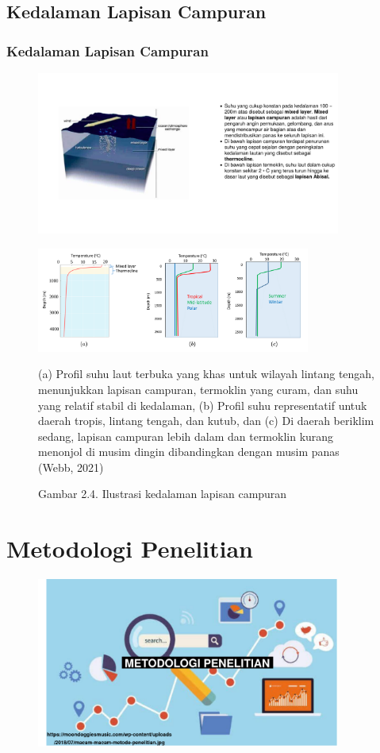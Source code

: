 \documentclass{beamer}
\begin{document}
\subsection{Kedalaman Lapisan Campuran}
\begin{frame}[allowframebreaks]
	\frametitle{Kedalaman Lapisan Campuran}
		\begin{figure}[H]
			\centering
			\includegraphics[width=10cm]{mld_1.png}
		\end{figure}	
		\begin{figure}[H]
		\centering
		\includegraphics[width=9cm]{mld_theory.png}
		\captionsetup{labelformat=empty}
		\caption{Gambar 2.4. Ilustrasi kedalaman lapisan campuran}
		\tiny
		(a) Profil suhu laut terbuka yang khas untuk wilayah lintang tengah, menunjukkan lapisan campuran, termoklin yang curam, dan suhu yang relatif stabil di kedalaman, (b) Profil suhu representatif untuk daerah tropis, lintang tengah, dan kutub, dan (c) Di daerah beriklim sedang, lapisan campuran lebih dalam dan termoklin kurang menonjol di musim dingin dibandingkan dengan musim panas (Webb, 2021)
		\label{fig:mld_theory}
	\end{figure}	
\end{frame}

\section{Metodologi Penelitian}
\begin{frame}
	\centering
	\begin{figure}[H]
		\centering
		\includegraphics[width=10cm]{Bg_3}
	\end{figure}
\end{frame}
\end{document}
